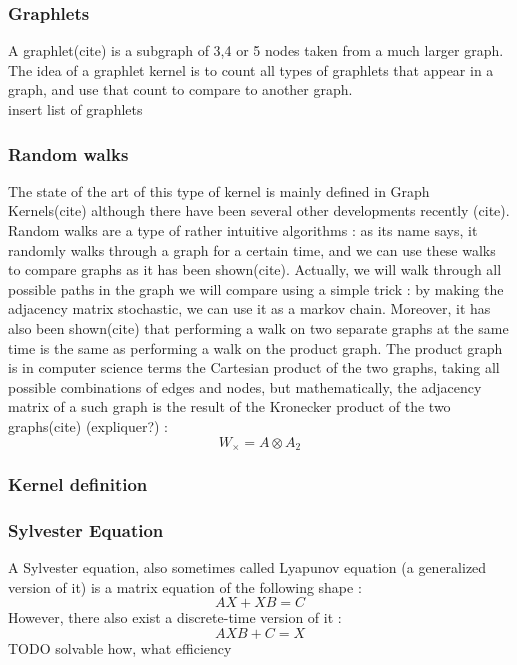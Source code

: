 \documentclass{article}
\theoremstyle{definition}
\begin{document}
\subsubsection{Graphlets}
A graphlet(cite) is a subgraph of 3,4 or 5 nodes taken from a much larger graph. The idea of a graphlet kernel is to count all types of graphlets that appear in a graph, and use that count to compare to another graph.\\
insert list of graphlets
\subsubsection{Random walks}
The state of the art of this type of kernel is mainly defined in Graph Kernels(cite) although there have been several other developments recently (cite). Random walks are a type of rather intuitive algorithms : as its name says, it randomly walks through a graph for a certain time, and we can use these walks to compare graphs as it has been shown(cite). Actually, we will walk through all possible paths in the graph we will compare using a simple trick : by making the adjacency matrix stochastic, we can use it as a markov chain. Moreover, it has also been shown(cite) that performing a walk on two separate graphs at the same time is the same as performing a walk on the product graph. The product graph is in computer science terms the Cartesian product of the two graphs, taking all possible combinations of edges and nodes, but mathematically, the adjacency matrix of a such graph is the result of the Kronecker product of the two graphs(cite) (expliquer?) :
\begin{equation}
    W_{\times}=A \otimes A_{2}
\end{equation}
\subsubsection{Kernel definition}

\subsubsection{Sylvester Equation}
A Sylvester equation, also sometimes called Lyapunov equation (a generalized version of it) is a matrix equation of the following shape :
\begin{equation}
    AX+XB=C
\end{equation}
However, there also exist a discrete-time version of it :
\begin{equation}
    AXB+C=X
\end{equation}
TODO solvable how, what efficiency\\
\end{document}
